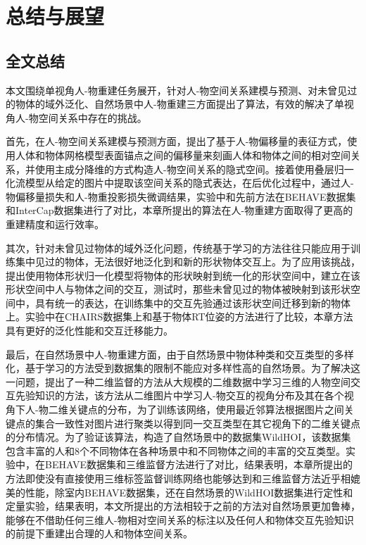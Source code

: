 \chapter{总结与展望}\label{chap:summary}

\section{全文总结}
本文围绕单视角人-物重建任务展开，针对人-物空间关系建模与预测、对未曾见过的物体的域外泛化、自然场景中人-物重建三方面提出了算法，有效的解决了单视角人-物空间关系中存在的挑战。

首先，在人-物空间关系建模与预测方面，提出了基于人-物偏移量的表征方式，使用人体和物体网格模型表面锚点之间的偏移量来刻画人体和物体之间的相对空间关系，并使用主成分降维的方式构造人-物空间关系的隐式空间。接着使用叠层归一化流模型从给定的图片中提取该空间关系的隐式表达，在后优化过程中，通过人-物偏移量损失和人-物重投影损失微调结果，实验中和先前方法在BEHAVE数据集和InterCap数据集进行了对比，本章所提出的算法在人-物重建方面取得了更高的重建精度和运行效率。

其次，针对未曾见过物体的域外泛化问题，传统基于学习的方法往往只能应用于训练集中见过的物体，无法很好地泛化到和新的形状物体交互上。为了应用该挑战，提出使用物体形状归一化模型将物体的形状映射到统一化的形状空间中，建立在该形状空间中人与物体之间的交互，测试时，那些未曾见过的物体被映射到该形状空间中，具有统一的表达，在训练集中的交互先验通过该形状空间迁移到新的物体上。实验中在CHAIRS数据集上和基于物体RT位姿的方法进行了比较，本章方法具有更好的泛化性能和交互迁移能力。

最后，在自然场景中人-物重建方面，由于自然场景中物体种类和交互类型的多样化，基于学习的方法受到数据集的限制不能应对多样性高的自然场景。为了解决这一问题，提出了一种二维监督的方法从大规模的二维数据中学习三维的人物空间交互先验知识的方法，该方法从二维图片中学习人-物交互的视角分布及其在各个视角下人-物二维关键点的分布，为了训练该网络，使用最近邻算法根据图片之间关键点的集合一致性对图片进行聚类以得到同一交互类型在其它视角下的二维关键点的分布情况。为了验证该算法，构造了自然场景中的数据集WildHOI，该数据集包含丰富的人和8个不同物体在各种场景中和不同物体之间的丰富的交互类型。实验中，在BEHAVE数据集和三维监督方法进行了对比，结果表明，本章所提出的方法即使没有直接使用三维标签监督训练网络也能够达到和三维监督方法近乎相媲美的性能，除室内BEHAVE数据集，还在自然场景的WildHOI数据集进行定性和定量实验，结果表明，本文所提出的方法相较于之前的方法对自然场景更加鲁棒，能够在不借助任何三维人-物相对空间关系的标注以及任何人和物体交互先验知识的前提下重建出合理的人和物体空间关系。

